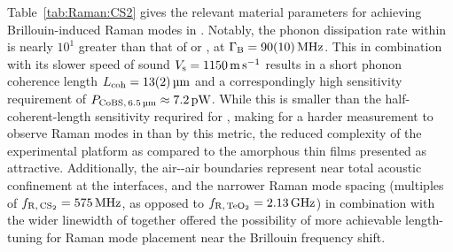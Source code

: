 Table~\ref{tab:Raman:CS2} gives the relevant material parameters for achieving Brillouin-induced Raman modes in . Notably, the phonon dissipation rate within  is nearly \(10^{1}\) greater than that of  or , at \(\Gamma_{\rm B} = \SI{90(10)}{\mega\hertz}\). This in combination with its slower speed of sound \(V_{\rm s} = \SI{1150}{\meter\per\second}\) results in a short phonon coherence length \(L_{\rm coh} = \SI{13(2)}{\micro\meter}\) and a correspondingly high sensitivity requirement of \(P_{\rm CoBS,\,\SI{6.5}{\micro\meter}} \approx \SI{7.2}{\pico\watt}\). While this is smaller than the half-coherent-length sensitivity requrired for , making for a harder measurement to observe Raman modes in  than  by this metric, the reduced complexity of the  experimental platform as compared to the amorphous thin films presented as attractive. Additionally, the air--air boundaries represent near total acoustic confinement at the interfaces, and the narrower Raman mode spacing (multiples of \(f_{\rm R,\,\ce{CS2}} = \SI{575}{\mega\hertz}\), as opposed to \(f_{\rm R,\,\ce{TeO2}} = \SI{2.13}{\giga\hertz}\)) in combination with the wider linewidth of  together offered the possibility of more achievable length-tuning for Raman mode placement near the Brillouin frequency shift.

